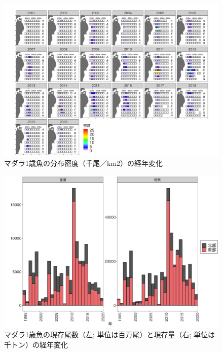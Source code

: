 \documentclass[11pt]{article} %
\begin{document}
\begin{linenumbers}
\begin{figure}[h]
  \centering
  \includegraphics[width = 14cm]{マダラ１＋dens.png}
  \caption{マダラ1歳魚の分布密度（千尾／km2）の経年変化}
\end{figure}

\begin{figure}[h]
  \centering
  \includegraphics[width = 14cm]{マダラ１＋trend.png}
  \caption{マダラ1歳魚の現存尾数（左; 単位は百万尾）と現存量（右; 単位は千トン）の経年変化}
\end{figure}


\end{linenumbers}
\end{document}

